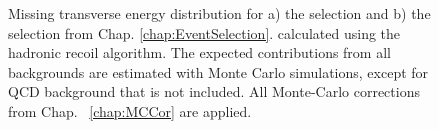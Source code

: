 \begin{figure}[!tbp]
\begin{minipage}[h]{0.49\linewidth}
\end{minipage}
\hfill
\begin{minipage}[h]{0.49\linewidth}
\end{minipage}
\caption{Missing transverse energy distribution for a) the \wenu selection and  b) the \wmunu selection from Chap. \ref{chap:EventSelection}. \etmiss  calculated using the hadronic recoil algorithm. The expected contributions from all backgrounds are estimated with Monte Carlo simulations, except for QCD background that is not included. All Monte-Carlo corrections from Chap. ~\ref{chap:MCCor} are applied.}
\label{ris:HadrRecoilEtMiss}
\end{figure}



